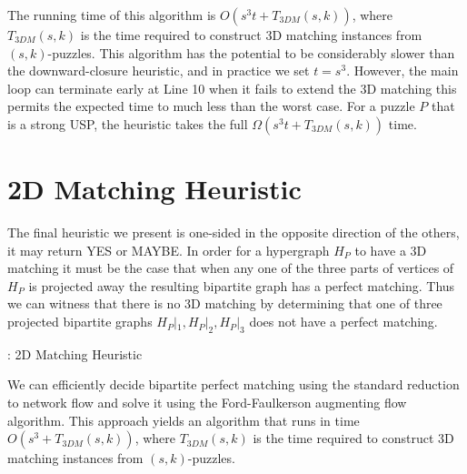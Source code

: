 \documentclass[11pt]{article}
\begin{document}
The running time of this algorithm is $O(s^3 t + T_{3DM}(s,k))$, where
$T_{3DM}(s,k)$ is the time required to construct 3D matching instances
from $(s,k)$-puzzles.  This algorithm has the potential to be
considerably slower than the downward-closure heuristic, and in
practice we set $t = s^3$.  However, the main loop can terminate early
at Line 10 when it fails to extend the 3D matching this permits the
expected time to much less than the worst case.  For a puzzle $P$ that
is a strong USP, the heuristic takes the full $\Omega(s^3 t +
T_{3DM}(s,k))$ time.





\section{2D Matching Heuristic}

\label{app:2dmatching}

The final heuristic we present is one-sided in the opposite direction
of the others, it may return YES or MAYBE.  In order for a hypergraph
$H_P$ to have a 3D matching it must be the case that when any one of
the three parts of vertices of $H_P$ is projected away the resulting
bipartite graph has a perfect matching.  Thus we can witness that
there is no 3D matching by determining that one of three projected
bipartite graphs $H_P|_1, H_P|_2, H_P|_3$ does not have a perfect
matching.

\begin{algorithm}[h]
  \caption{: 2D Matching Heuristic}
  \label{alg:2dm}
\begin{algorithmic}[1]

  \Else
  \EndIf
  \EndFunction
\end{algorithmic}
\end{algorithm}

We can efficiently decide bipartite perfect matching using the
standard reduction to network flow and solve it using the
Ford-Faulkerson augmenting flow algorithm.  This approach yields an
algorithm that runs in time $O(s^3 + T_{3DM}(s,k))$, where
$T_{3DM}(s,k)$ is the time required to construct 3D matching instances
from $(s,k)$-puzzles.
\end{document}
